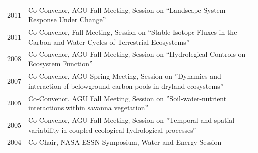 \begin{longtable}{l p{5.5in}}
2011 & Co-Convenor, AGU Fall Meeting, Session on ``Landscape System Response Under Change'' \\
2011 & Co-Convenor, Fall Meeting, Session on ``Stable Isotope Fluxes in the Carbon and Water Cycles of Terrestrial Ecosystems'' \\
2008 & Co-Convenor, AGU Fall Meeting, Session on ``Hydrological Controls on Ecosystem Function'' \\
2007 & Co-Convenor, AGU Spring Meeting, Session on ''Dynamics and interaction of belowground carbon pools in dryland ecosystems'' \\
2005 & Co-Convenor, AGU Fall Meeting, Session on ''Soil-water-nutrient interactions within savanna vegetation'' \\
2005 & Co-Convenor, AGU Fall Meeting, Session on ''Temporal and spatial variability in coupled ecological-hydrological processes'' \\
2004 & Co-Chair, NASA ESSN Symposium, Water and Energy Session \\

\end{longtable}
